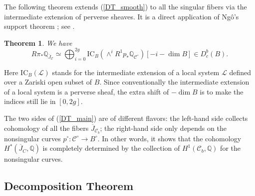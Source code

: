 \documentclass{pspum-l}
\theoremstyle{plain}
\newtheorem{thm}{Theorem}[section]
\theoremstyle{definition}
\theoremstyle{remark}
\newcommand{\BQ}{{\mathbb{Q}}}
\newcommand{\CC}{{\mathcal C}}
\newcommand{\CL}{{\mathcal L}}
\begin{document}
The following theorem extends (\ref{DT_smooth}) to all the singular fibers via the intermediate extension of perverse sheaves. It is a direct application of Ng\^{o}'s support theorem \cite{Ngo}; see \cite[Theorem 2.4]{MY}.

\begin{thm}\label{thm1.1}
We have
\begin{equation}\label{DT_main}
R\pi_* \BQ_{\overline{J}_\CC} \simeq \bigoplus_{i=0}^{2g} \mathrm{IC}_B\left(  \wedge^i R^1p_* \BQ_{{\CC^\circ}}\right)[-i -\dim B] \in D^b_c(B).
    \end{equation}
\end{thm}

Here $\mathrm{IC}_B(\CL)$ stands for the intermediate extension of a local system $\CL$ defined over a Zariski open subset of $B$. Since conventionally the intermediate extension of a local system is a perverse sheaf, the extra shift of $-\dim B$ is to make the indices still lie in $[0, 2g]$.

The two sides of (\ref{DT_main}) are of different flavors: the left-hand side collects cohomology of all the fibers $\overline{J}_{\CC_b}$; the right-hand side only depends on the nonsingular curves $p^\circ: \CC^\circ \to B^\circ$. In other words, it shows that the cohomology $H^*(\overline{J}_C, \BQ)$ is completely determined by the collection of $H^1(\CC_b, \BQ)$ for the nonsingular curves.





\subsection{Decomposition Theorem}\label{sec1.2}
\end{document}
